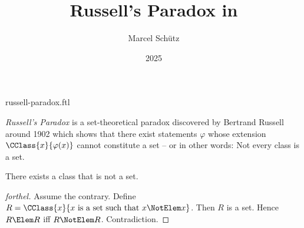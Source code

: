 \documentclass{stex}
\title{Russell's Paradox in \Naproche}
\author{Marcel Schütz}
\date{2025}
\begin{document}
\begin{smodule}{russell-paradox.ftl}



\maketitle

\noindent \emph{Russell's Paradox} is a set-theoretical paradox discovered by
Bertrand Russell around 1902 \cite[chapter XV]{Frege1980} which shows that 
there exist statements $\varphi$ whose extension
$\CClass{x}{\varphi(x)}$ cannot constitute a set -- or in other words:
Not every class is a set.

\begin{forthel}
  \begin{theorem}[title=Russell's Paradox,name=Russell Paradox]
    There exists a class that is not a set.
  \end{theorem}
  \begin{proof}[forthel]
    Assume the contrary.
    Define $R = \CClass{x}{x \text{ is a set such that } x \NotElem x}$.
    Then $R$ is a set.
    Hence $R \Elem R$ iff $R \NotElem R$.
    Contradiction.
  \end{proof}
\end{forthel}

\printbibliography
{}
\end{smodule}
\end{document}

